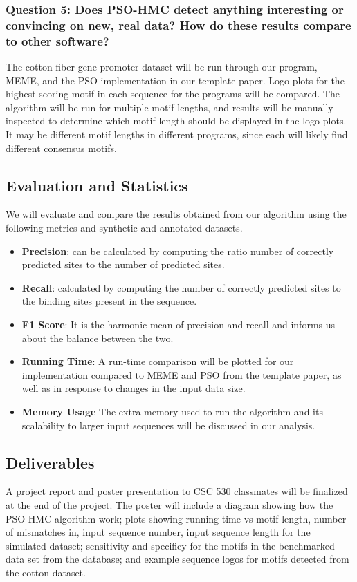 \documentclass{article}
\begin{document}
\subsubsection{Question 5: Does PSO-HMC detect anything interesting or convincing on new, real data? How do these results compare to other software?}
The cotton fiber gene promoter dataset will be run through our program, MEME, and the PSO implementation in our template paper. Logo plots for the highest scoring motif in each sequence for the programs will be compared. The algorithm will be run for multiple motif lengths, and results will be manually inspected to determine which motif length should be displayed in the logo plots. It may be different motif lengths in different programs, since each will likely find different consensus motifs.
\subsection{Evaluation and Statistics}
We will evaluate and compare the results obtained from our algorithm using the following metrics and synthetic and annotated datasets.
\begin{itemize}
	\item \textbf{Precision}: can be calculated by computing the ratio number of correctly predicted sites to the number of predicted sites.
	\item \textbf{Recall}: calculated by computing the number of correctly predicted sites to the binding sites present in the sequence.
	\item \textbf{F1 Score}: It is the harmonic mean of precision and recall and informs us about the balance between the two.
	\item \textbf{Running Time}: A run-time comparison will be plotted for our implementation compared to MEME and PSO from the template paper, as well as in response to changes in the input data size.
	\item \textbf{Memory Usage} The extra memory used to run the algorithm and its scalability to larger input sequences will be discussed in our analysis.
\end{itemize}
\subsection{Deliverables}
A project report and poster presentation to CSC 530 classmates will be finalized at the end of the project. The poster will include a diagram showing how the PSO-HMC algorithm work; plots showing running time vs motif length, number of mismatches in, input sequence number, input sequence length for the simulated dataset; sensitivity and specificy for the motifs in the benchmarked data set from the database; and example sequence logos for motifs detected from the cotton dataset.  
  
\end{document}
